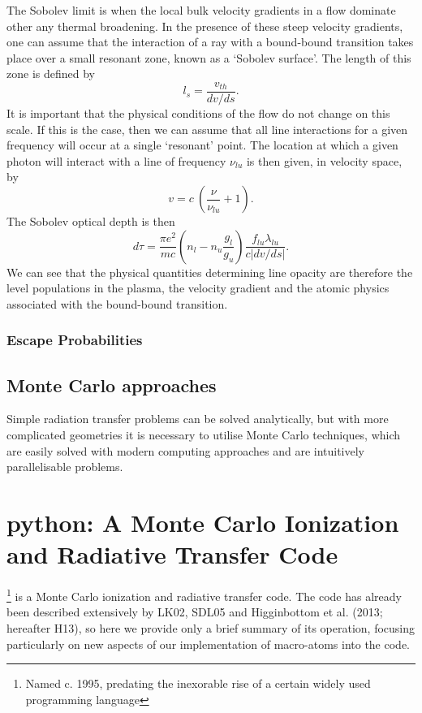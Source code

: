 The Sobolev limit is when the local bulk velocity gradients in a flow 
dominate other any thermal broadening. In the presence of these steep
velocity gradients, one can assume that the interaction of a ray with a bound-bound
transition takes place over a small resonant zone, known as a 
`Sobolev surface'. The length of this zone is defined by
\begin{equation}
l_s = \frac{v_{th}}{dv / ds}.
\end{equation}
It is important that the physical conditions of the flow do not change on this scale.
If this is the case, then we can assume that all line interactions for a given 
frequency will occur at a single `resonant' point. The location at which
a given photon will interact with a line of frequency $\nu_{lu}$
is then given, in velocity space, by
\begin{equation}
v = c~\left(\frac{\nu}{\nu_{lu}} + 1\right).
\end{equation}
The Sobolev optical depth is then
\begin{equation}
d \tau = \frac{\pi e^2}{m c}  \left(n_l - n_u \frac{g_l}{g_u} \right) \frac{f_{lu} \lambda_{lu}}{c | dv / ds |}.
\end{equation}
We can see that the physical quantities determining line opacity are therefore 
the level populations in the plasma, the velocity gradient and the atomic physics
associated with the bound-bound transition.



\subsubsection{Escape Probabilities}


\subsection{Monte Carlo approaches}

Simple radiation transfer problems can be solved analytically,
but with more complicated geometries it is necessary to utilise Monte Carlo
techniques, which are easily solved with modern computing approaches and 
are intuitively parallelisable problems.

\section{{\sc python}: A Monte Carlo Ionization and Radiative Transfer Code}

\py\footnote{Named c. 1995, predating the inexorable rise of a certain widely used
programming language} is a Monte Carlo ionization and radiative transfer code. 
The code has already been described extensively by LK02, SDL05 and 
Higginbottom et al. (2013; hereafter H13), so here we provide only a brief summary of its operation, 
focusing particularly on new aspects of our implementation of macro-atoms into the code.


